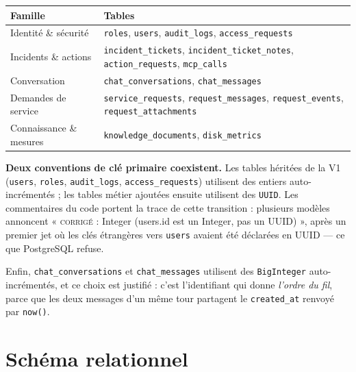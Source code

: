 \documentclass[11pt,a4paper]{report}
\newcommand{\tbl}[1]{\texttt{\small\textcolor{oasisamber}{#1}}}
\begin{document}
\begin{longtable}{@{}p{3.4cm}p{11.4cm}@{}}
\toprule
\textbf{Famille} & \textbf{Tables}\\
\midrule
\endhead
Identité \& sécurité & \tbl{roles}, \tbl{users}, \tbl{audit\_logs}, \tbl{access\_requests}\\
Incidents \& actions & \tbl{incident\_tickets}, \tbl{incident\_ticket\_notes}, \tbl{action\_requests}, \tbl{mcp\_calls}\\
Conversation & \tbl{chat\_conversations}, \tbl{chat\_messages}\\
Demandes de service & \tbl{service\_requests}, \tbl{request\_messages}, \tbl{request\_events}, \tbl{request\_attachments}\\
Connaissance \& mesures & \tbl{knowledge\_documents}, \tbl{disk\_metrics}\\
\bottomrule
\end{longtable}

\begin{infobox}
\textbf{Deux conventions de clé primaire coexistent.} Les tables héritées de la
V1 (\tbl{users}, \tbl{roles}, \tbl{audit\_logs}, \tbl{access\_requests})
utilisent des entiers auto-incrémentés ; les tables métier ajoutées ensuite
utilisent des \texttt{UUID}. Les commentaires du code portent la trace de cette
transition : plusieurs modèles annoncent « \textsc{corrigé} : Integer (users.id
est un Integer, pas un UUID) », après un premier jet où les clés étrangères
vers \tbl{users} avaient été déclarées en UUID --- ce que PostgreSQL refuse.

Enfin, \tbl{chat\_conversations} et \tbl{chat\_messages} utilisent des
\texttt{BigInteger} auto-incrémentés, et ce choix est justifié : c'est
l'identifiant qui donne \emph{l'ordre du fil}, parce que les deux messages d'un
même tour partagent le \texttt{created\_at} renvoyé par \texttt{now()}.
\end{infobox}

\section{Schéma relationnel}
\end{document}

